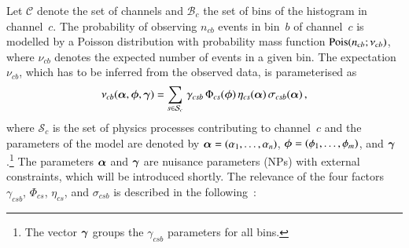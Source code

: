 Let $\mathcal{C}$ denote the set of channels and $\mathcal{B}_{c}$ the set of
bins of the histogram in channel~$c$. The probability of observing $n_{cb}$
events in bin~$b$ of channel~$c$ is modelled by a Poisson distribution with
probability mass function $\operatorname{Pois}(n_{cb}; \nu_{cb})$, where $\nu_{cb}$ denotes
the expected number of events in a given bin. The expectation~$\nu_{cb}$, which
has to be inferred from the observed data, is parameterised
as~\cite{cranmer2012}
\begin{align*}
  \nu_{cb}(\bm{\alpha}, \bm{\phi}, \bm{\gamma}) =
  \sum_{s \in \mathcal{S}_{c}} \, \gamma_{csb} \, \Phi_{cs}(\bm{\phi}) \, \eta_{cs}(\bm{\alpha}) \, \sigma_{csb}(\bm{\alpha}) \,\text{,}
\end{align*}
where $\mathcal{S}_{c}$ is the set of physics processes contributing to
channel~$c$ and the parameters of the model are denoted by
${\bm{\alpha} = (\alpha_1, \dots, \alpha_n)}$,
${\bm{\phi} = (\phi_1, \dots, \phi_m)}$, and $\bm{\gamma}$.\footnote{The
  vector $\bm{\gamma}$ groups the $\gamma_{csb}$ parameters for all bins.}
The parameters $\bm{\alpha}$ and $\bm{\gamma}$ are nuisance parameters
(NPs) with external constraints, which will be introduced shortly.  The
relevance of the four factors $\gamma_{csb}$, $\Phi_{cs}$, $\eta_{cs}$, and
$\sigma_{csb}$ is described in the following~\cite{cranmer2012}:
